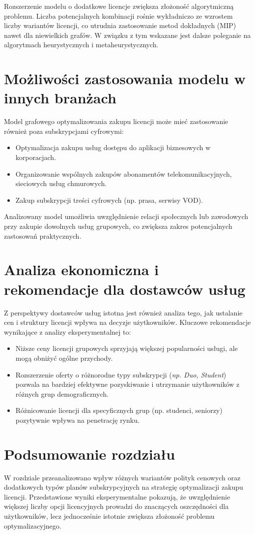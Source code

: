 Rozszerzenie modelu o dodatkowe licencje zwiększa złożoność algorytmiczną problemu. Liczba potencjalnych kombinacji rośnie wykładniczo ze wzrostem liczby wariantów licencji, co utrudnia zastosowanie metod dokładnych (MIP) nawet dla niewielkich grafów. W związku z tym wskazane jest dalsze poleganie na algorytmach heurystycznych i metaheurystycznych.

\section{Możliwości zastosowania modelu w innych branżach}

Model grafowego optymalizowania zakupu licencji może mieć zastosowanie również poza subskrypcjami cyfrowymi:

\begin{itemize}
    \item Optymalizacja zakupu usług dostępu do aplikacji biznesowych w korporacjach.
    \item Organizowanie wspólnych zakupów abonamentów telekomunikacyjnych, sieciowych usług chmurowych.
    \item Zakup subskrypcji treści cyfrowych (np. prasa, serwisy VOD).
\end{itemize}

Analizowany model umożliwia uwzględnienie relacji społecznych lub zawodowych przy zakupie dowolnych usług grupowych, co zwiększa zakres potencjalnych zastosowań praktycznych.

\section{Analiza ekonomiczna i rekomendacje dla dostawców usług}

Z perspektywy dostawców usług istotna jest również analiza tego, jak ustalanie cen i struktury licencji wpływa na decyzje użytkowników. Kluczowe rekomendacje wynikające z analizy eksperymentalnej to:

\begin{itemize}
    \item Niższe ceny licencji grupowych sprzyjają większej popularności usługi, ale mogą obniżyć ogólne przychody.
    \item Rozszerzenie oferty o różnorodne typy subskrypcji (\textit{np. Duo, Student}) pozwala na bardziej efektywne pozyskiwanie i utrzymanie użytkowników z różnych grup demograficznych.
    \item Różnicowanie licencji dla specyficznych grup (np. studenci, seniorzy) pozytywnie wpływa na penetrację rynku.
\end{itemize}

\section{Podsumowanie rozdziału}

W rozdziale przeanalizowano wpływ różnych wariantów polityk cenowych oraz dodatkowych typów planów subskrypcyjnych na strategię optymalizacji zakupu licencji. Przedstawione wyniki eksperymentalne pokazują, że uwzględnienie większej liczby opcji licencyjnych prowadzi do znaczących oszczędności dla użytkowników, lecz jednocześnie istotnie zwiększa złożoność problemu optymalizacyjnego.
